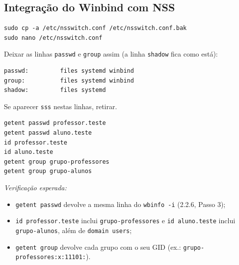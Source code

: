 
\subsection[Integração do Winbind com NSS]{Integração do Winbind com NSS}


\begin{lstlisting}[style=bashstyle]
sudo cp -a /etc/nsswitch.conf /etc/nsswitch.conf.bak
sudo nano /etc/nsswitch.conf
\end{lstlisting}

Deixar as linhas \texttt{passwd} e \texttt{group} assim (a linha \texttt{shadow} fica como está):

\begin{lstlisting}[style=cfgstyle]
passwd:         files systemd winbind
group:          files systemd winbind
shadow:         files systemd
\end{lstlisting}

Se aparecer \texttt{sss} nestas linhas, retirar.


\begin{lstlisting}[style=bashstyle]
getent passwd professor.teste
getent passwd aluno.teste
id professor.teste
id aluno.teste
getent group grupo-professores
getent group grupo-alunos
\end{lstlisting}

\emph{Verificação esperada:}

\begin{itemize}
\item \texttt{getent passwd} devolve a mesma linha do \texttt{wbinfo -i} (2.2.6, Passo 3);
\item \texttt{id professor.teste} inclui \texttt{grupo-professores} e \texttt{id aluno.teste} inclui \texttt{grupo-alunos}, além de \texttt{domain users};
\item \texttt{getent group} devolve cada grupo com o seu GID (ex.: \texttt{grupo-professores:x:11101:}).
\end{itemize}

